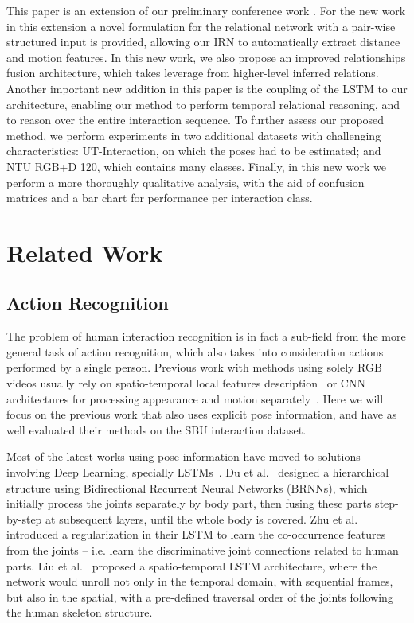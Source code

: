 \documentclass[journal,twoside]{IEEEtran}
\begin{document}
This paper is an extension of our preliminary conference work \cite{Perez2019a}.
For the new work in this extension a novel formulation for the relational network with a pair-wise structured input is provided, allowing our IRN to automatically extract distance and motion features.
In this new work, we also propose an improved relationships fusion architecture, which takes leverage from higher-level inferred relations.
Another important new addition in this paper is the coupling of the LSTM to our architecture, enabling our method to perform temporal relational reasoning, and to reason over the entire interaction sequence.
To further assess our proposed method, we perform experiments in two additional datasets with challenging characteristics: UT-Interaction, on which the poses had to be estimated; and NTU RGB+D 120, which contains many classes.
Finally, in this new work we perform a more thoroughly qualitative analysis, with the aid of confusion matrices and a bar chart for performance per interaction class.










 \section{Related Work} \label{sec:related_work}


\subsection{Action Recognition}


The problem of human interaction recognition is in fact a sub-field from the more general task of action recognition, which also takes into consideration actions performed by a single person.
Previous work with methods using solely RGB videos usually rely on spatio-temporal local features description~\cite{Wang2013} or CNN architectures for processing appearance and motion separately~\cite{Simonyan2014,Wu2016,Shi2017a}.
Here we will focus on the previous work that also uses explicit pose information, and have as well evaluated their methods on the SBU interaction dataset.

Most of the latest works using pose information have moved to solutions involving Deep Learning, specially LSTMs~\cite{Du2015,Zhu2016a,Liu2016a,Liu2018}.
Du et al.~\cite{Du2015} designed a hierarchical structure using Bidirectional Recurrent Neural Networks (BRNNs), which initially process the joints separately by body part, then fusing these parts step-by-step at subsequent layers, until the whole body is covered.
Zhu et al.~\cite{Zhu2016a} introduced a regularization in their LSTM to learn the co-occurrence features from the joints -- i.e. learn the discriminative joint connections related to human parts.
Liu et al.~\cite{Liu2016a} proposed a spatio-temporal LSTM architecture, where the network would unroll not only in the temporal domain, with sequential frames, but also in the spatial, with a pre-defined traversal order of the joints following the human skeleton structure.
\end{document}
